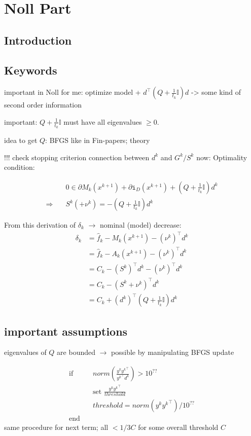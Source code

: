 \section{Noll Part}
\label{variable_metric}

\subsection{Introduction}

\subsection{Keywords}

important in Noll for me: optimize model + \(d^{\top}(Q+\frac{1}{t_k}\mathbb{I})d\)
-> some kind of second order information

important: \(Q+\frac{1}{t_k}\mathbb{I}\) must have all eigenvalues \(\geq 0\).

idea to get \(Q\): BFGS like in Fin-papers; theory

!!! check stopping criterion
connection between \(d^k\) and \(G^k/S^k\) now:
Optimality condition: 

\begin{align}
	& 0 \in \partial M_k(x^{k+1})+\partial\mathtt{i}_{D}(x^{k+1})+\left(Q+\frac{1}{t_k}\mathbb{I}\right)d^k \\
	\Rightarrow \quad & S^k(+\nu^k) = -\left(Q+\frac{1}{t_k}\mathbb{I}\right)d^k
\end{align}

From this derivation of \(\delta_k\) \(\to\) nominal (model) decrease:
\begin{align}
	\delta_k  &= \hat{f}_k - M_k(x^{k+1}) - (\nu^k)^{\top}d^k\\
	&= \hat{f}_k - A_k(x^{k+1}) - (\nu^k)^{\top}d^k\\
	&= C_k - (S^k)^{\top}d^k - (\nu^k)^{\top}d^k \\
	&= C_k - (S^k+\nu^k)^{\top}d^k \\
	&= C_k + (d^k)^{\top}\left(Q+\frac{1}{t_k}\mathbb{I}\right)d^k
\end{align}

\subsection{important assumptions}
eigenvalues of \(Q\) are bounded \(\to\) possible by manipulating BFGS update

\begin{align}
	\text{if} &\quad norm\left(\frac{y^k{y^k}^{\top}}{{y^k}^{\top}d^k}\right) > 10^{??} \\
	&\quad \text{set } \frac{y^k{y^k}^{\top}}{threshold} \\
	&\quad threshold = norm\left(y^k{y^k}^{\top}\right)/10^{??} \\
	\text{end} &
\end{align}
same procedure for next term; all \(<1/3C\) for some overall threshold \(C\) 

